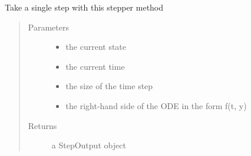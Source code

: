 \documentclass[letterpaper,10pt,english]{sphinxmanual}
\begin{document}
\begin{fulllineitems}
\begin{fulllineitems}
\label{\detokenize{spitfire.time.methods:spitfire.time.methods.GeneralAdaptiveExplicitRungeKuttaMultipleEmbedded.single_step}}
Take a single step with this stepper method
\begin{quote}\begin{description}
\item[{Parameters}] \leavevmode\begin{itemize}
\item {} 
 \textendash{} the current state

\item {} 
 \textendash{} the current time

\item {} 
 \textendash{} the size of the time step

\item {} 
 \textendash{} the right-hand side of the ODE in the form f(t, y)

\end{itemize}

\item[{Returns}] \leavevmode
a StepOutput object

\end{description}\end{quote}

\end{fulllineitems}


\end{fulllineitems}

\end{document}
